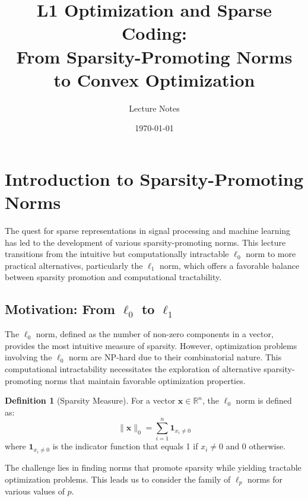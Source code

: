 \documentclass[12pt]{article}
\title{L1 Optimization and Sparse Coding:\\ From Sparsity-Promoting Norms to Convex Optimization}
\author{Lecture Notes}
\date{\today}
\renewcommand{\vec}[1]{\mathbf{#1}}
\newcommand{\norm}[1]{\lVert#1\rVert}
\newcommand{\R}{\mathbb{R}}
\theoremstyle{definition}
\newtheorem{definition}[theorem]{Definition}
\begin{document}
\maketitle

\tableofcontents
\newpage


\section{Introduction to Sparsity-Promoting Norms}

The quest for sparse representations in signal processing and machine learning has led to the development of various sparsity-promoting norms. This lecture transitions from the intuitive but computationally intractable $\ell_0$ norm to more practical alternatives, particularly the $\ell_1$ norm, which offers a favorable balance between sparsity promotion and computational tractability.

\subsection{Motivation: From $\ell_0$ to $\ell_1$}

The $\ell_0$ norm, defined as the number of non-zero components in a vector, provides the most intuitive measure of sparsity. However, optimization problems involving the $\ell_0$ norm are NP-hard due to their combinatorial nature. This computational intractability necessitates the exploration of alternative sparsity-promoting norms that maintain favorable optimization properties.

\begin{definition}[Sparsity Measure]
    For a vector $\vec{x} \in \R^n$, the $\ell_0$ norm is defined as:
    \begin{equation}
        \norm{\vec{x}}_0 = \sum_{i=1}^n \mathbf{1}_{x_i \neq 0}
    \end{equation}
    where $\mathbf{1}_{x_i \neq 0}$ is the indicator function that equals 1 if $x_i \neq 0$ and 0 otherwise.
\end{definition}

The challenge lies in finding norms that promote sparsity while yielding tractable optimization problems. This leads us to consider the family of $\ell_p$ norms for various values of $p$.

\newpage
\end{document}
